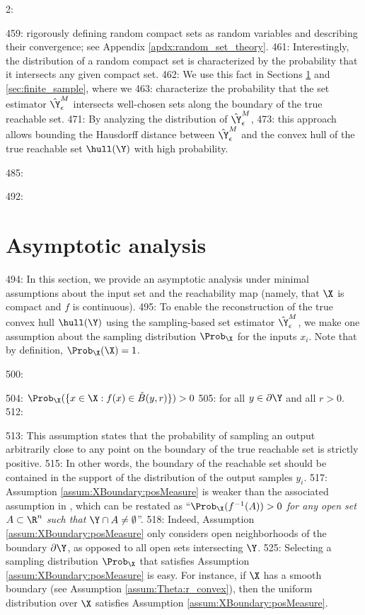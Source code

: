 2: \documentclass[12pt]{l4dc2022} %
\begin{document}
459: rigorously defining random compact sets as random variables and  describing their convergence; see Appendix \ref{apdx:random_set_theory}. 
461: Interestingly, the distribution of a random compact set is characterized by the probability that it intersects any given compact set. 
462: We use this fact in Sections \ref{sec:asymptotic} and \ref{sec:finite_sample}, where we %
463: characterize the probability that the set estimator $\hat\Y_\epsilon^M$ intersects well-chosen sets along the boundary of the true reachable set. 
471: By analyzing the distribution of $\hat\Y_\epsilon^M$, 
473: this approach allows bounding the Hausdorff distance between $\hat\Y_\epsilon^M$ and the convex hull of the true reachable set $\hull(\Y)$ with high probability.

485: \vspace{-1mm}

492: \section{Asymptotic analysis}\label{sec:asymptotic}

494: In this section, we provide an asymptotic analysis under minimal assumptions about the input set and the reachability map (namely, that $\X$ is compact and $f$ is continuous). %
495: To enable the reconstruction of the true convex hull $\hull(\Y)$ using the sampling-based set estimator $\hat\Y_\epsilon^M$, we make one assumption about the sampling distribution $\Prob_\X$ for the inputs $x_i$. Note that by definition, $\Prob_\X(\X)=1$.

500: \begin{myassumption}\label{assum:XBoundary:posMeasure} 
504: $\Prob_\X(\{x\in\X: f(x)\in\mathring{B}(y,r)\})>0$  
505: for all $y\in\partial\Y$ and all $r>0$.
512: \end{myassumption}
513: This assumption states that the probability of sampling an output arbitrarily close to any point on the boundary of the true reachable set is strictly positive. 
515: In other words, the boundary of the reachable set should be contained in the support of the distribution of the output samples $y_i$.  
517: Assumption \ref{assum:XBoundary:posMeasure} is weaker than the associated assumption in \citep[Theorem 2]{LewPavone2020}, which can be restated as ``\textit{$\Prob_\X(f^{-1}(A))>0$ for any open set $A\subset\R^n$ such that $\Y\cap A\neq \emptyset$}''. 
518: Indeed, Assumption \ref{assum:XBoundary:posMeasure} only considers open neighborhoods of the boundary $\partial\Y$, as opposed to all open sets intersecting $\Y$. 
525: Selecting a sampling distribution $\Prob_\X$ that satisfies Assumption \ref{assum:XBoundary:posMeasure} is easy. For instance, if $\X$ has a smooth boundary (see Assumption \ref{assum:Theta:r_convex}), then the uniform distribution over $\X$ satisfies Assumption \ref{assum:XBoundary:posMeasure}. 
\end{document}
